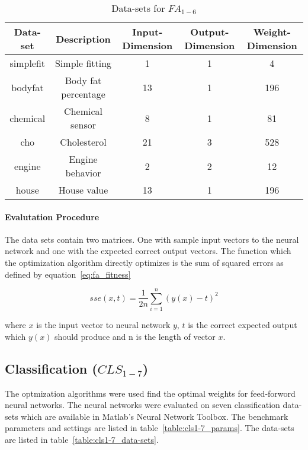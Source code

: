 \begin{table}[H]
  \centering
  \begin{center}
    \footnotesize
    \begin{tabular}{ | c | c | c | c | c | }
      \hline
      Data-set & Description & Input-Dimension & Output-Dimension & Weight-Dimension \\ \hline
      simplefit & Simple fitting & 1 & 1 & 4 \\ \hline
      bodyfat & Body fat percentage & 13 & 1 & 196 \\ \hline
      chemical & Chemical sensor & 8 & 1 & 81 \\ \hline
      cho & Cholesterol & 21 & 3 & 528 \\ \hline
      engine & Engine behavior  & 2 & 2 & 12 \\ \hline
      house & House value & 13 & 1 & 196 \\ \hline
    \end{tabular}
  \end{center}
  \caption{Data-sets for $FA_{1-6}$}
  \label{table:fa1-6_data-sets}
\end{table}

\paragraph{Evalutation Procedure}

The data sets contain two matrices. One with sample input vectors to the neural network and one with the expected correct output vectors. The function which the optimization algorithm directly optimizes is the sum of squared errors as defined by equation~\ref{eq:fa_fitness}

\begin{equation} \label{eq:fa_fitness}
  sse(x,t) = \frac{1}{2n} \sum_{i=1}^{n}{(y(x)-t)^2}
\end{equation}

where $x$ is the input vector to neural network $y$, $t$ is the correct expected output which $y(x)$ should produce and n is the length of vector $x$.

\subsection{Classification ($CLS_{1-7}$)}

The optmization algorithms were used find the optimal weights for feed-forword neural networks. The neural networks were evaluated on seven classification data-sets which are available in Matlab's Neural Network Toolbox. The benchmark parameters and settings are listed in table~\ref{table:cls1-7_params}. The data-sets are listed in table~\ref{table:cls1-7_data-sets}.

